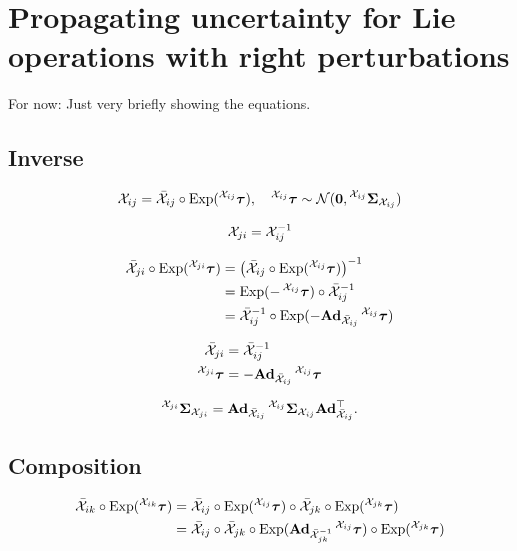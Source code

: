 \chapter{Propagating uncertainty for Lie operations with right perturbations} \label{ch:app-prop-lie-operations}
For now: Just very briefly showing the equations.

\section{Inverse}
\begin{equation}
    \cX_{ij} = \bar{\cX}_{ij} \circ \Exp(\prescript{\cX_{ij}}{}{\vectau}), \quad \prescript{\cX_{ij}}{}{\vectau} \sim \cN(\matr{0}, \prescript{\cX_{ij}}{}{\matSigma_{\cX_{ij}}})
\end{equation}

\begin{equation}
    \cX_{ji} = \cX^{-1}_{ij}
\end{equation}

\begin{subequations}
\begin{align}
    \bar{\cX}_{ji} \circ \Exp(\prescript{\cX_{ji}}{}{\vectau}) &= \left( \bar{\cX}_{ij} \circ \Exp(\prescript{\cX_{ij}}{}{\vectau}) \right)^{-1}\\
    &= \Exp(-\prescript{\cX_{ij}}{}{\vectau}) \circ \bar{\cX}_{ij}^{-1}\\
    &= \bar{\cX}_{ij}^{-1} \circ \Exp(- \mAd_{\bar{\cX}_{ij}} \prescript{\cX_{ij}}{}{\vectau})
\end{align}
\end{subequations}

\begin{align}
    \bar{\cX}_{ji} &= \bar{\cX}_{ij}^{-1}\\
    \prescript{\cX_{ji}}{}{\vectau} &= - \mAd_{\bar{\cX}_{ij}} \prescript{\cX_{ij}}{}{\vectau}
\end{align}

\begin{equation}
  \prescript{\cX_{ji}}{}{\matSigma}_{\cX_{ji}} = \mAd_{\bar{\cX}_{ij}} \prescript{\cX_{ij}}{}{\matSigma_{\cX_{ij}}} \mAd_{\bar{\cX}_{ij}}\trans.
\end{equation}

\section{Composition}

\begin{subequations}
\begin{align}
    \bar{\cX}_{ik} \circ \Exp(\prescript{\cX_{ik}}{}{\vectau}) &= \bar{\cX}_{ij} \circ \Exp(\prescript{\cX_{ij}}{}{\vectau}) \circ \bar{\cX}_{jk} \circ \Exp(\prescript{\cX_{jk}}{}{\vectau})\\
    &= \bar{\cX}_{ij} \circ \bar{\cX}_{jk} \circ \Exp(\mAd_{\bar{\cX}_{jk}^{-1}} \prescript{\cX_{ij}}{}{\vectau}) \circ \Exp(\prescript{\cX_{jk}}{}{\vectau})
\end{align}
\end{subequations}

